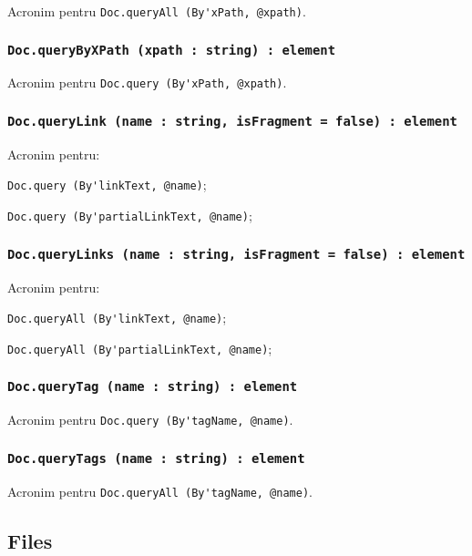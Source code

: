 Acronim pentru \lstinline|Doc.queryAll (By'xPath, @xpath)|.

\subsubsection{\lstinline|Doc.queryByXPath (xpath : string) : element|}

Acronim pentru \lstinline|Doc.query (By'xPath, @xpath)|.

\subsubsection{\lstinline|Doc.queryLink (name : string, isFragment = false) : element|}

Acronim pentru:
\begin{icItems}
	\item \lstinline|Doc.query (By'linkText, @name)|;
	\item \lstinline|Doc.query (By'partialLinkText, @name)|;
\end{icItems}

\subsubsection{\lstinline|Doc.queryLinks (name : string, isFragment = false) : element|}

Acronim pentru:
\begin{icItems}
	\item \lstinline|Doc.queryAll (By'linkText, @name)|;
	\item \lstinline|Doc.queryAll (By'partialLinkText, @name)|;
\end{icItems}

\subsubsection{\lstinline|Doc.queryTag (name : string) : element|}

Acronim pentru \lstinline|Doc.query (By'tagName, @name)|.

\subsubsection{\lstinline|Doc.queryTags (name : string) : element|}

Acronim pentru \lstinline|Doc.queryAll (By'tagName, @name)|.

\subsection{{\color{orange} Files}}

